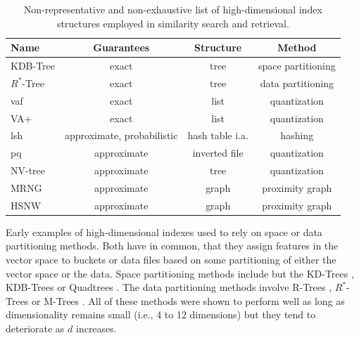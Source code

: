 \begin{table}
    \begin{tabular}{ | l | c | c | c |}
        \hline
        \textbf{Name} & \textbf{Guarantees} & \textbf{Structure} & \textbf{Method} \\
        \hline
        \hline
        KDB-Tree \cite{Robinson:1981KDB} & exact & tree & space partitioning \\  
        \hline
        $R^{*}$-Tree \cite{Beckmann:1990RTree} & exact & tree & data partitioning \\ 
        \hline
        \acrshort{vaf} \cite{Weber:1998Va} & exact & list & quantization \\ 
        \hline
        VA+ \cite{Ferhatosmanoglu:2000Vector} & exact & list & quantization \\ 
        \hline
        \acrshort{lsh} \cite{Indyk1998:Approximate, Wang:2017ASurvey} & approximate, probabilistic & hash table i.a.  & hashing \\ 
        \hline
        \acrshort{pq} \cite{Jegou:2010Product} & approximate & inverted file & quantization \\ 
        \hline
        NV-tree \cite{Lejsek:2009NVTree} & approximate & tree & quantization \\ 
        \hline
        MRNG \cite{Lejsek:2009NVTree} & approximate & graph & proximity graph \\ 
        \hline
        HSNW \cite{Malkov:2018Efficient} & approximate & graph & proximity graph \\ 
        \hline
    \end{tabular}
    \caption{Non-representative and non-exhaustive list of high-dimensional index structures employed in similarity search and retrieval.}
    \label{table:index_structures}
\end{table}

Early examples of high-dimensional indexes used to rely on space or data partitioning methods. Both have in common, that they assign features in the vector space to buckets or data files based on some partitioning of either the vector space or the data. Space partitioning methods include but the KD-Trees \cite{Bentley:1975Multidimensional}, KDB-Trees \cite{Robinson:1981KDB} or Quadtrees \cite{Finkel:1974Quad}. The data partitioning methods involve R-Trees \cite{Guttmann:1984RTrees}, $R^{*}$-Trees \cite{Beckmann:1990RTree} or M-Trees \cite{Ciaccia:1997Mtree}. All of these methods were shown to perform well as long as dimensionality remains small (i.e., 4 to 12 dimensions) but they tend to deteriorate as $d$ increases.

